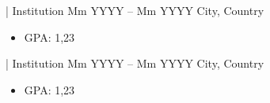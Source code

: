 \documentclass[10pt,a4paper,ragged2e,withhyper]{altacv}
\begin{document}
\begin{paracol}{2}
                 {| 
                 {Institution} %
                 }
                 {Mm YYYY -- Mm YYYY} %
                 {City, Country} %
                \begin{itemize}
                    \item {GPA: 1,23} %
                \end{itemize}
                \divider
            
                 {| 
                 {Institution} %
                 }
                 {Mm YYYY -- Mm YYYY} %
                 {City, Country} %
                \begin{itemize}
                    \item {GPA: 1,23} %
                \end{itemize}
                \divider
        

\end{paracol}
\end{document}
